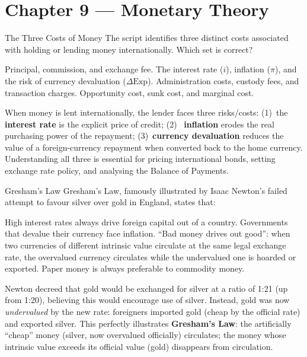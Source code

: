 \documentclass[paper=a5]{scrartcl}
\begin{document}
\section{Chapter 9 — Monetary Theory}

\begin{question}[type=mc]{The Three Costs of Money}
The script identifies three distinct costs associated with holding or
lending money internationally. Which set is correct?
\begin{choices}
  \choice        Principal, commission, and exchange fee.
  \correctchoice The interest rate ($i$), inflation ($\pi$), and the
                 risk of currency devaluation ($\Delta\text{Exp}$).
  \choice        Administration costs, custody fees, and transaction charges.
  \choice        Opportunity cost, sunk cost, and marginal cost.
\end{choices}
\begin{solution}
  When money is lent internationally, the lender faces three risks/costs:
  (1)~the \textbf{interest rate} is the explicit price of credit; (2)~
  \textbf{inflation} erodes the real purchasing power of the repayment;
  (3)~\textbf{currency devaluation} reduces the value of a foreign-currency
  repayment when converted back to the home currency. Understanding all three
  is essential for pricing international bonds, setting exchange rate policy,
  and analysing the Balance of Payments.
\end{solution}
\end{question}

\begin{question}[type=mc]{Gresham's Law}
Gresham's Law, famously illustrated by Isaac Newton's failed attempt to
favour silver over gold in England, states that:
\begin{choices}
  \choice        High interest rates always drive foreign capital out of
                 a country.
  \choice        Governments that devalue their currency face inflation.
  \correctchoice ``Bad money drives out good'': when two currencies of
                 different intrinsic value circulate at the same legal
                 exchange rate, the overvalued currency circulates while the
                 undervalued one is hoarded or exported.
  \choice        Paper money is always preferable to commodity money.
\end{choices}
\begin{solution}
  Newton decreed that gold would be exchanged for silver at a ratio of 1:21
  (up from 1:20), believing this would encourage use of silver. Instead,
  gold was now \emph{undervalued} by the new rate: foreigners imported gold
  (cheap by the official rate) and exported silver. This perfectly illustrates
  \textbf{Gresham's Law}: the artificially ``cheap'' money (silver, now
  overvalued officially) circulates; the money whose intrinsic value exceeds
  its official value (gold) disappears from circulation.
\end{solution}
\end{question}
\end{document}
